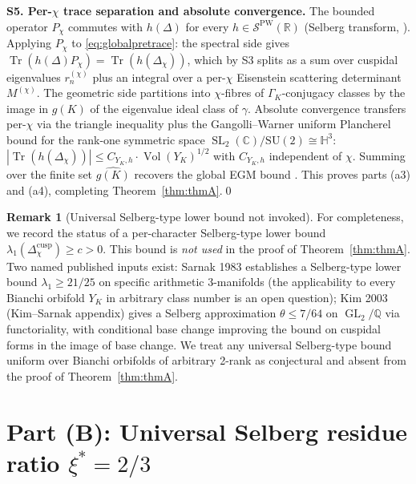 \documentclass[11pt,a4paper,reqno]{amsart}
\theoremstyle{definition}
\newtheorem{remark}[theorem]{Remark}
\DeclareMathOperator{\SL}{SL}
\DeclareMathOperator{\GL}{GL}
\DeclareMathOperator{\Vol}{Vol}
\DeclareMathOperator{\Tr}{Tr}
\newcommand{\HH}{\mathbb{H}}
\newcommand{\RR}{\mathbb{R}}
\newcommand{\CC}{\mathbb{C}}
\newcommand{\QQ}{\mathbb{Q}}
\newcommand{\YK}{Y_K}
\newcommand{\GK}{\Gamma_K}
\newcommand{\gK}{g(K)}
\newcommand{\dualgK}{\widehat{g(K)}}
\newcommand{\PW}{\mathcal{S}^{\mathrm{PW}}}
\newcommand{\xis}{\xi^{*}}
\begin{document}
\smallskip
\noindent\textbf{S5. Per-$\chi$ trace separation and absolute convergence.}
The bounded operator $P_\chi$ commutes with $h(\Delta)$ for every
$h\in\PW(\RR)$ (Selberg transform, \cite[\S6.6]{ElstrodtGrunewaldMennicke1998}).
Applying $P_\chi$ to \eqref{eq:globalpretrace}: the spectral side gives
$\Tr(h(\Delta)P_\chi)=\Tr(h(\Delta_\chi))$, which by S3 splits as a sum over
cuspidal eigenvalues $r_n^{(\chi)}$ plus an integral over a per-$\chi$
Eisenstein scattering determinant $M^{(\chi)}$.  The geometric side
partitions into $\chi$-fibres of $\GK$-conjugacy classes by the image in
$\gK$ of the eigenvalue ideal class of $\gamma$.  Absolute convergence
transfers per-$\chi$ via the triangle inequality plus the Gangolli--Warner
uniform Plancherel bound \cite[\S3]{GangolliWarner1980} for the rank-one
symmetric space $\SL_2(\CC)/\mathrm{SU}(2)\cong\HH^3$:
$|\Tr(h(\Delta_\chi))|\le C_{\YK,h}\cdot\Vol(\YK)^{1/2}$ with $C_{\YK,h}$
independent of $\chi$.  Summing over the finite set $\dualgK$ recovers the
global EGM bound \cite[\S6.4]{ElstrodtGrunewaldMennicke1998}.  This proves
parts (a3) and (a4), completing Theorem~\ref{thm:thmA}.\qed

\begin{remark}[Universal Selberg-type lower bound not invoked]\label{rem:Selberggap}
For completeness, we record the status of a per-character Selberg-type lower
bound $\lambda_1(\Delta_\chi^{\mathrm{cusp}})\geq c>0$.  This bound is \emph{not
used} in the proof of Theorem~\ref{thm:thmA}.  Two named published inputs
exist: Sarnak 1983 \cite{Sarnak1983} establishes a Selberg-type lower bound
$\lambda_1 \geq 21/25$ on specific arithmetic 3-manifolds (the applicability
to every Bianchi orbifold $\YK$ in arbitrary class number is an open question);
Kim 2003 \cite{Kim2003} (Kim--Sarnak appendix) gives a Selberg approximation
$\theta\leq 7/64$ on $\GL_2/\QQ$ via functoriality, with conditional base
change improving the bound on cuspidal forms in the image of base change.  We
treat any universal Selberg-type bound uniform over Bianchi orbifolds of
arbitrary 2-rank as conjectural and absent from the proof of
Theorem~\ref{thm:thmA}.
\end{remark}

\section{Part (B): Universal Selberg residue ratio $\xis = 2/3$}\label{sec:thm-B}
\end{document}
